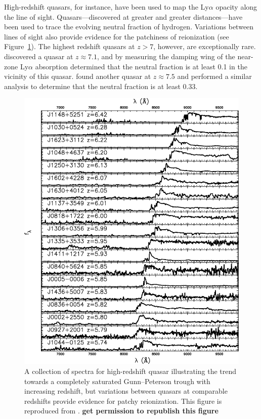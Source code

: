 \begin{bibunit}
High-redshift quasars, for instance, have been used to map the Ly$\alpha$
opacity along the line of sight. Quasars---discovered at greater and greater distances---have been
used to trace the evolving neutral fraction of hydrogen. Variations between lines of sight also
provide evidence for the patchiness of reionization (see Figure~\ref{fig:fan-quasars}). The highest
redshift quasars at $z>7$, however, are exceptionally rare.  \citet{2011Natur.474..616M} discovered
a quasar at $z\approx7.1$, and by measuring the damping wing of the near-zone Ly$\alpha$ absorption
determined that the neutral fraction is at least 0.1 in the vicinity of this quasar.
\citet{2018Natur.553..473B} found another quasar at $z\approx7.5$ and performed a similar analysis
to determine that the neutral fraction is at least 0.33.

\begin{figure}[p]
    \centering
    \includegraphics[width=\textwidth]{figures/chapter1/fan-quasar-spectra}
    \caption{
        A collection of spectra for high-redshift quasar illustrating the trend towards a completely
        saturated Gunn--Peterson trough with increasing redshift, but variations between quasars at
        comparable redshifts provide evidence for patchy reionization. This figure is reproduced
        from \citet{2006AJ....132..117F}. \textbf{get permission to republish this figure}
    }
    \label{fig:fan-quasars}
\end{figure}


\end{bibunit}
